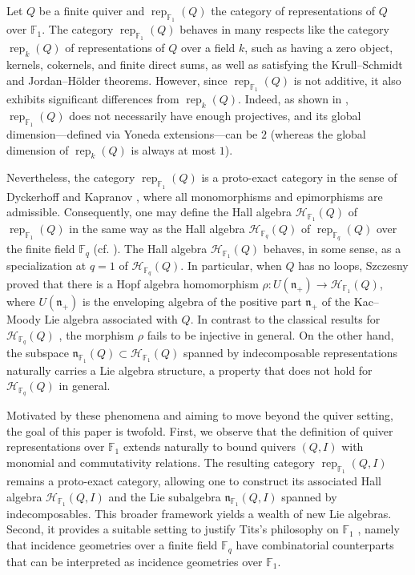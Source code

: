 \documentclass[12pt]{amsart}
\theoremstyle{remark}
\theoremstyle{definition}
\numberwithin{equation}{section}
\begin{document}
Let $Q$ be a finite quiver and $\operatorname{rep}_{\mathbb{F}_1}(Q)$ the category of representations of $Q$ over $\mathbb{F}_1$. The category $\operatorname{rep}_{\mathbb{F}_1}(Q)$ behaves in many respects like the category $\operatorname{rep}_k(Q)$ of representations of $Q$ over a field $k$, such as having a zero object, kernels, cokernels, and finite direct sums, as well as satisfying the Krull--Schmidt and Jordan--H\"{o}lder theorems. However, since $\operatorname{rep}_{\mathbb{F}_1}(Q)$ is not additive, it also exhibits significant differences from $\operatorname{rep}_k(Q)$. 
Indeed, as shown in \cite{FRY24, FYZ26b}, $\operatorname{rep}_{\mathbb{F}_1}(Q)$ does not necessarily have enough projectives, and its global dimension---defined via Yoneda extensions---can be $2$ (whereas the global dimension of $\operatorname{rep}_k(Q)$ is always at most $1$).

Nevertheless, the category $\operatorname{rep}_{\mathbb{F}_1}(Q)$ is a proto-exact category in the
sense of Dyckerhoff and Kapranov \cite{DK19}, where all monomorphisms and epimorphisms are
admissible. Consequently, one may define the Hall algebra $\mathcal{H}_{\mathbb{F}_1}(Q)$ of $\operatorname{rep}_{\mathbb{F}_1}(Q)$ in the same way as the Hall algebra $\mathcal{H}_{\mathbb{F}_q}(Q)$  of $\operatorname{rep}_{\mathbb{F}_q}(Q)$ over the finite field $\mathbb{F}_q$ (cf. \cite{Ringel90}). The Hall algebra $\mathcal{H}_{\mathbb{F}_1}(Q)$ behaves, in some sense, as a specialization at $q=1$ of $\mathcal{H}_{\mathbb{F}_q}(Q)$. In particular, when $Q$ has no loops,  Szczesny \cite{Sz12} proved that there is a Hopf algebra homomorphism $\rho: U(\mathfrak{n}_+)\to \mathcal{H}_{\mathbb{F}_1}(Q)$, where $U(\mathfrak{n}_+)$ is the enveloping algebra of the positive part $\mathfrak{n}_+$ of the Kac--Moody Lie algebra associated with $Q$. In contrast to the classical results for $\mathcal{H}_{\mathbb{F}_q}(Q)$ \cite{Ringel90,Green}, the morphism $\rho$ fails to be injective in general. On the other hand, the subspace $\mathfrak{n}_{\mathbb{F}_1}(Q) \subset \mathcal{H}_{\mathbb{F}_1}(Q)$ spanned by indecomposable representations naturally carries a Lie algebra structure, a property that does not hold for $\mathcal{H}_{\mathbb{F}_q}(Q)$ in general.





Motivated by these phenomena and aiming to move beyond the quiver setting, the goal of this paper is twofold. First, we observe that the definition of quiver representations over $\mathbb{F}_1$ extends naturally to bound quivers $(Q,I)$ with monomial and commutativity relations. The resulting category $\operatorname{rep}_{\mathbb{F}_1}(Q,I)$ remains a proto-exact category, allowing one to construct its associated Hall algebra $\mathcal{H}_{\mathbb{F}_1}(Q,I)$ and the Lie subalgebra $\mathfrak{n}_{\mathbb{F}_1}(Q,I)$ spanned by indecomposables. This broader framework yields a wealth of new Lie algebras. Second, it provides a suitable setting to justify Tits's philosophy on $\mathbb{F}_1$ \cite{Tits56}, namely that incidence geometries over a finite field $\mathbb{F}_q$ have combinatorial counterparts that can be interpreted as incidence geometries over $\mathbb{F}_1$.
\end{document}
